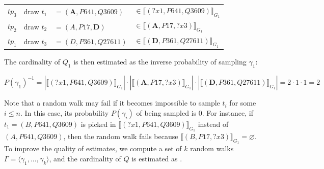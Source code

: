 \begin{small}
  \begin{tabular}{l|lll}
    $tp_3$ & draw  $t_1$ &$= (\textbf{A}, P641, Q3609)$ & $\in \llbracket (?x1, P641, Q3609) \rrbracket_{G_1}$ \\
    $tp_2$ & draw  $t_2$ &$= (A, P17, \textbf{D})$ & $ \in \llbracket (\textbf{A}, P17, ?x3) \rrbracket_{G_1}$  \\
    $tp_1$ & draw  $t_3$ &$= (D, P361, Q27611)$ & $\in \llbracket (\textbf{D}, P361, Q27611) \rrbracket_{G_1}$  
  \end{tabular}
\end{small} 

\noindent The cardinality of $Q_1$ is then estimated as the inverse
probability of sampling $\gamma_1$:

\noindent
\begin{small}
$P(\gamma_1)^{-1}  =  |\llbracket (?x1, P641, Q3609) \rrbracket_{G_1}| \cdot
                          |\llbracket (\textbf{A}, P17, ?x3) \rrbracket_{G_1}| \cdot
                          |\llbracket (\textbf{D}, P361,
                          Q27611) \rrbracket_{G_1}| 
                      =  2 \cdot 1 \cdot 1 = 2$
\end{small}


\noindent Note that a random walk may fail if it becomes impossible to sample $t_i$ for
some $i \leq n$. In this case, its probability $P(\gamma_i)$ of being sampled is 0.
For instance, if $t_1 = (B, P641, Q3609)$ is picked in
$\llbracket (?x1, P641, Q3609) \rrbracket_{G_1}$
instead of $(A, P641, Q3609)$, then the random walk fails because
$\llbracket (B, P17, ?x3) \rrbracket_{G_1} = \varnothing$.
%
To improve the quality of estimates, we compute a set of $k$ random
walks $\Gamma = \langle \gamma_1, ..., \gamma_k \rangle$, and the
cardinality of $Q$ is estimated as
.


